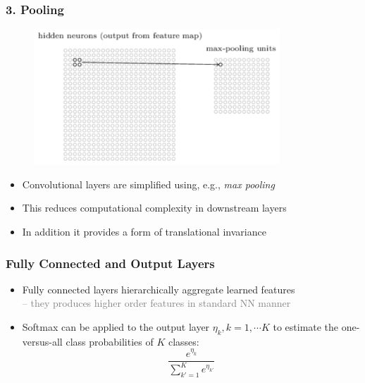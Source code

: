 \documentclass[xcolor={dvipsnames}]{beamer}
\begin{document}
\frame
{
 \frametitle{3. Pooling}

\begin{figure}
\centering
{\includegraphics[height=2in]{stuff/convol9.png}}
\end{figure}

\begin{itemize}
\item Convolutional layers are simplified using, e.g., \emph{max pooling} 
\item This reduces computational complexity in downstream layers
\item In addition it provides a form of translational invariance 
\end{itemize}

}


\frame
{
 \frametitle{Fully Connected and Output Layers}

\begin{figure}
\centering
{}
\end{figure}

\begin{itemize}
\item Fully connected layers hierarchically aggregate learned features\\
\textcolor{gray}{-- they produces higher order features in standard NN manner} 
\item Softmax can be applied to the output layer $\eta_k, k=1, \cdots K$ 
to estimate the one-versus-all class probabilities of $K$ classes: 
$$ \frac{e^{\eta_k}}{\sum_{k'=1}^K e^{\eta_{k'}}}$$
\end{itemize}

}
\end{document}
